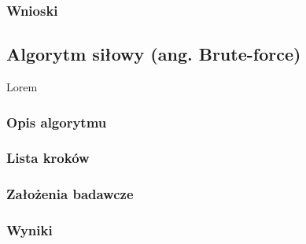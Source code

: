 \documentclass{article}
\begin{document}
  \subsubsection{Wnioski}

  \subsection{Algorytm siłowy (ang. Brute-force)}
  Lorem
  \subsubsection{Opis algorytmu}
  \subsubsection{Lista kroków}
  \subsubsection{Założenia badawcze}
  \subsubsection{Wyniki}
  
  \FloatBarrier
\end{document}
